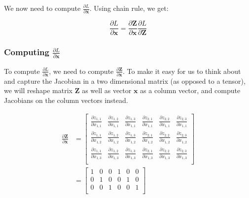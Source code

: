 \documentclass{article}
\newcommand{\vecr}[1]{\bm{#1}}
\newcommand{\matr}[1]{\mathbf{#1}} %
\begin{document}
We now need to compute $\frac{\partial L}{\partial \vecr{x}}$. Using chain rule, we get:

\begin{equation} \label{dX_broadcast_row_vector}
\frac{\partial L}{\partial \vecr{x}} = \frac{\partial \matr{Z}}{\partial \vecr{x}}\frac{\partial L}{\partial \matr{Z}}
\end{equation}

\subsubsection{Computing $\frac{\partial L}{\partial \vecr{x}}$}
To compute $\frac{\partial L}{\partial \vecr{x}}$, we need to compute $\frac{\partial \matr{Z}}{\partial \vecr{x}}$. To make it easy for us to think about and capture the Jacobian in a two dimensional matrix (as opposed to a tensor), we will reshape matrix $\matr{Z}$ as well as vector $\vecr{x}$ as a column vector, and compute Jacobians on the column vectors instead.

\begin{align}
\frac{\partial \matr{Z}}{\partial \vecr{x}} &=
\begin{bmatrix}
\frac{\partial z_{1,1}}{\partial x_{1,1}} & \frac{\partial z_{1,2}}{\partial x_{1,1}} & \frac{\partial z_{1,3}}{\partial x_{1,1}} & \frac{\partial z_{2,1}}{\partial x_{1,1}} & \frac{\partial z_{2,2}}{\partial x_{1,1}} & \frac{\partial z_{2,3}}{\partial x_{1,1}} \\[0.7em]
\frac{\partial z_{1,1}}{\partial x_{1,2}} & \frac{\partial z_{1,2}}{\partial x_{1,2}} & \frac{\partial z_{1,3}}{\partial x_{1,2}} & \frac{\partial z_{2,1}}{\partial x_{1,2}} & \frac{\partial z_{2,2}}{\partial x_{1,2}} & \frac{\partial z_{2,3}}{\partial x_{1,2}} \\[0.7em]
\frac{\partial z_{1,1}}{\partial x_{1,3}} & \frac{\partial z_{1,2}}{\partial x_{1,3}} & \frac{\partial z_{1,3}}{\partial x_{1,3}} & \frac{\partial z_{2,1}}{\partial x_{1,3}} & \frac{\partial z_{2,2}}{\partial x_{1,3}} & \frac{\partial z_{2,3}}{\partial x_{1,3}} \\[0.7em]
\end{bmatrix} \nonumber
\\ \label{dZbydX_broadcast_row_vector}
&=
\begin{bmatrix}
1 & 0 & 0 & 1 & 0 & 0\\%
0 & 1 & 0 & 0 & 1 & 0\\%
0 & 0 & 1 & 0 & 0 & 1\\%
\end{bmatrix}
\end{align}
\end{document}
